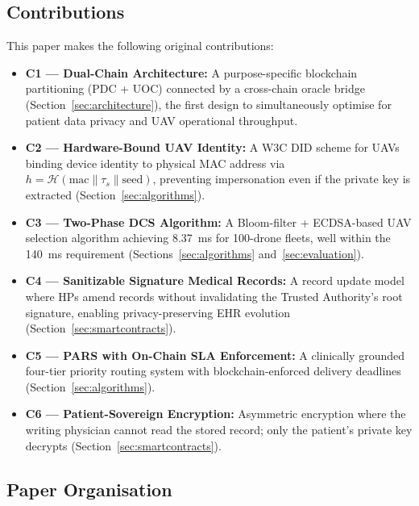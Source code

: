 \documentclass[sigplan,screen,review=false]{acmart}
\begin{document}
\subsection{Contributions}
\label{sec:contributions}

This paper makes the following original contributions:

\begin{itemize}
  \item \textbf{C1 --- Dual-Chain Architecture:} A purpose-specific
    blockchain partitioning (PDC + UOC) connected by a cross-chain
    oracle bridge (Section~\ref{sec:architecture}), the first design to
    simultaneously optimise for patient data privacy and UAV operational
    throughput.

  \item \textbf{C2 --- Hardware-Bound UAV Identity:} A W3C DID scheme
    for UAVs binding device identity to physical MAC address via
    $h = \mathcal{H}(\text{mac} \| \tau_s \| \text{seed})$, preventing
    impersonation even if the private key is extracted
    (Section~\ref{sec:algorithms}).

  \item \textbf{C3 --- Two-Phase DCS Algorithm:} A Bloom-filter +
    ECDSA-based UAV selection algorithm achieving 8.37~ms for 100-drone
    fleets, well within the 140~ms requirement
    (Sections~\ref{sec:algorithms} and~\ref{sec:evaluation}).

  \item \textbf{C4 --- Sanitizable Signature Medical Records:} A record
    update model where HPs amend records without invalidating the
    Trusted Authority's root signature, enabling privacy-preserving EHR
    evolution (Section~\ref{sec:smartcontracts}).

  \item \textbf{C5 --- PARS with On-Chain SLA Enforcement:} A
    clinically grounded four-tier priority routing system with
    blockchain-enforced delivery deadlines (Section~\ref{sec:algorithms}).

  \item \textbf{C6 --- Patient-Sovereign Encryption:} Asymmetric
    encryption where the writing physician cannot read the stored
    record; only the patient's private key decrypts
    (Section~\ref{sec:smartcontracts}).
\end{itemize}

\subsection{Paper Organisation}
\end{document}
